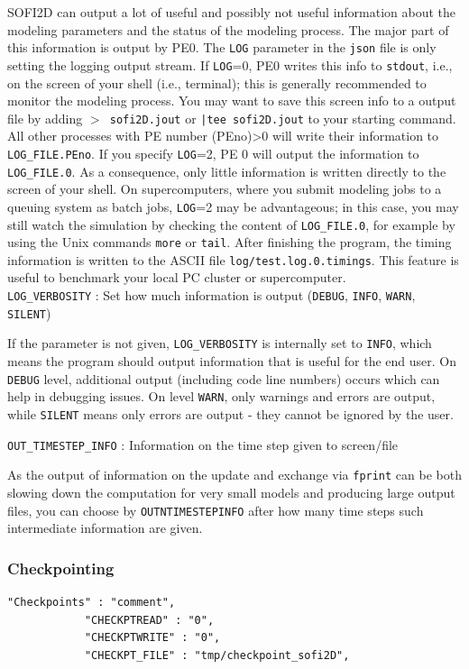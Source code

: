 SOFI2D can output a lot of useful and possibly not useful information about the modeling parameters and the status of the modeling process. The major part of this information is output by PE0. The \texttt{LOG} parameter in the \texttt{json} file is only setting the logging output stream. If \texttt{LOG}=0, PE0 writes this info to \texttt{stdout}, i.e., on the screen of your shell (i.e., terminal); this is generally recommended  to monitor the modeling process. You may want to save this screen info to a output file by adding \texttt{$>$ sofi2D.jout} or \texttt{|tee sofi2D.jout} to your starting command. All other processes with PE number (PEno)>0 will write their information to \texttt{LOG\_FILE.PEno}. If you specify \texttt{LOG}=2, PE 0 will output the information to \texttt{LOG\_FILE.0}. As a consequence, only little information is written directly to the screen of your shell. On supercomputers, where you submit modeling jobs to a queuing system as batch jobs, \texttt{LOG}=2 may be advantageous; in this case, you may still watch the simulation by checking the content of \texttt{LOG\_FILE.0}, for example by using the Unix commands \texttt{more} or \texttt{tail}. After finishing the program, the timing information is written to the ASCII file \texttt{log/test.log.0.timings}. This feature is useful to benchmark your local PC cluster or supercomputer.\\

\texttt{LOG\_VERBOSITY} : Set how much information is output (\texttt{DEBUG}, \texttt{INFO}, \texttt{WARN}, \texttt{SILENT})

If the parameter is not given, \texttt{LOG\_VERBOSITY} is internally set to \texttt{INFO}, which means the program should output information that is useful for the end user. On \texttt{DEBUG} level, additional output (including code line numbers) occurs which can help in debugging issues. On level \texttt{WARN}, only warnings and errors are output, while \texttt{SILENT} means only errors are output - they cannot be ignored by the user.

\texttt{OUT\_TIMESTEP\_INFO} : Information on the time step given to screen/file

As the output of information on the update and exchange via \texttt{fprint} can be both slowing down the computation for very small models and producing large output files, you can choose by \texttt{OUTNTIMESTEPINFO} after how many time steps such intermediate information are given.

\subsubsection{Checkpointing}
\begin{verbatim}
"Checkpoints" : "comment",
            "CHECKPTREAD" : "0",
            "CHECKPTWRITE" : "0",
            "CHECKPT_FILE" : "tmp/checkpoint_sofi2D",
\end{verbatim}

